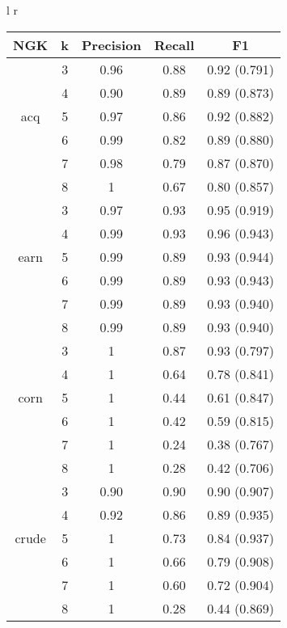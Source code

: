 \begin{tabular}{l r}
\begin{tabular}{| c | c | c | c | c | }
	\hline NGK & k & Precision & Recall & F1   \\ \hline
	
	& 3 & 0.96 & 0.88 & 0.92 (0.791)    \\ 
	& 4 & 0.90 & 0.89 &  0.89 (0.873)   \\
	acq	& 5 & 0.97 & 0.86 & 0.92  (0.882)   \\ 
	& 6 & 0.99 & 0.82 & 0.89  (0.880)   \\
	& 7 & 0.98 & 0.79 & 0.87  (0.870)   \\
	& 8 & 1 & 0.67 & 0.80  (0.857)   \\
	\hline
	
	
	
	& 3 & 0.97 & 0.93 &  0.95 (0.919)   \\ 
	& 4 & 0.99 & 0.93 &  0.96 (0.943)   \\ 
	earn & 5 & 0.99 & 0.89 &  0.93  (0.944)  \\ 
	& 6 & 0.99 & 0.89 &  0.93  (0.943)  \\ 
	& 7 & 0.99 & 0.89 &  0.93  (0.940)  \\ 
	& 8 & 0.99 & 0.89 &  0.93  (0.940)  \\ \hline
	
	
	
	& 3 & 1 & 0.87 & 0.93  (0.797)   \\ 
	& 4 & 1 & 0.64 & 0.78  (0.841)   \\ 
	corn	& 5 & 1 & 0.44 &  0.61 (0.847)   \\ 
	& 6 & 1 & 0.42 & 0.59  (0.815)   \\ 
	& 7 & 1 & 0.24 & 0.38  (0.767)  \\ 
	& 8 & 1 & 0.28& 0.42  (0.706)   \\ \hline
	
	
	& 3 & 0.90 & 0.90 &  0.90  (0.907)  \\ 
	& 4 & 0.92 & 0.86 & 0.89  (0.935)   \\ 
	crude & 5 & 1 & 0.73 &  0.84 (0.937)   \\ 
	& 6 & 1 & 0.66 &  0.79 (0.908)   \\
	& 7 & 1 & 0.60 &  0.72 (0.904)   \\
	& 8 & 1 & 0.28 &  0.44  (0.869)  \\ \hline
	
	
	
\end{tabular} \vspace{10pt} \\ 



\end{tabular}
